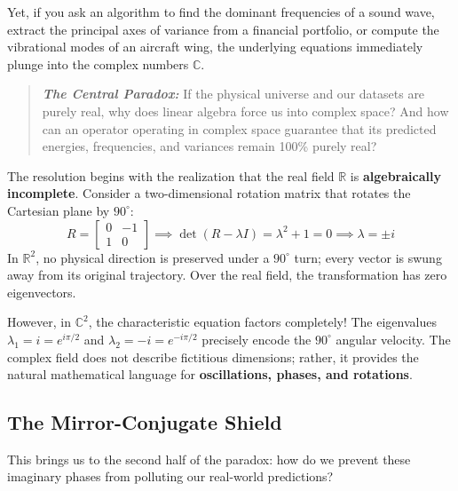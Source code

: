 Yet, if you ask an algorithm to find the dominant frequencies of a sound wave, extract the principal axes of variance from a financial portfolio, or compute the vibrational modes of an aircraft wing, the underlying equations immediately plunge into the complex numbers $\mathbb{C}$.

\begin{quote}
\textit{\textbf{The Central Paradox:}} If the physical universe and our datasets are purely real, why does linear algebra force us into complex space? And how can an operator operating in complex space guarantee that its predicted energies, frequencies, and variances remain 100\% purely real?
\end{quote}

The resolution begins with the realization that the real field $\mathbb{R}$ is \textbf{algebraically incomplete}. Consider a two-dimensional rotation matrix that rotates the Cartesian plane by $90^\circ$:
\begin{equation}
R = \begin{bmatrix} 0 & -1 \\ 1 & 0 \end{bmatrix} \implies \det(R - \lambda I) = \lambda^2 + 1 = 0 \implies \lambda = \pm i
\end{equation}
In $\mathbb{R}^2$, no physical direction is preserved under a $90^\circ$ turn; every vector is swung away from its original trajectory. Over the real field, the transformation has zero eigenvectors.

However, in $\mathbb{C}^2$, the characteristic equation factors completely! The eigenvalues $\lambda_1 = i = e^{i\pi/2}$ and $\lambda_2 = -i = e^{-i\pi/2}$ precisely encode the $90^\circ$ angular velocity. The complex field does not describe fictitious dimensions; rather, it provides the natural mathematical language for \textbf{oscillations, phases, and rotations}.

\subsection{The Mirror-Conjugate Shield}
This brings us to the second half of the paradox: how do we prevent these imaginary phases from polluting our real-world predictions?

